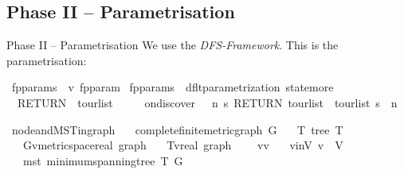 \documentclass[%
	sans,
	12pt,
]{beamer}
\def\isacartoucheopen{}%
\def\isacartoucheclose{}%
\begin{document}
\subsection{Phase II -- Parametrisation} %
\begin{frame}{Phase II -- Parametrisation}
\vspace{8mm}
We use the \textit{DFS-Framework}. This is the parametrisation:
\vspace{-2mm}
\begin{isabelle}
	\isamarkupfalse%
	\ fp{}{\isacharunderscore}params\ {\isacharcolon}{\isacharcolon}\ {\isachardoublequoteopen}{\isacharprime}v\ fp{}{\isacharunderscore}param{\isachardoublequoteclose}\ \isanewline
	{\isachardoublequoteopen}fp{}{\isacharunderscore}params\ {\isasymequiv}\ dflt{\isacharunderscore}parametrization\ state{\isachardot}more\isanewline
	\ \ {\isacharparenleft}RETURN\ {\isasymlparr}\ tour{\isacharunderscore}list\ {\isacharequal}\ {\isacharbrackleft}{\isacharbrackright}\ {\isasymrparr}{\isacharparenright}\isanewline
	\ \ {\isasymlparr}on{\isacharunderscore}discover\ {\isacharcolon}{\isacharequal}\ {\isasymlambda}{\isacharunderscore}\ n\ s{\isachardot}\ RETURN\ {\isasymlparr}tour{\isacharunderscore}list\ {\isacharequal}\ tour{\isacharunderscore}list\ s\ {\isacharat}\ {\isacharbrackleft}n{\isacharbrackright}{\isasymrparr}\ {\isasymrparr}{\isachardoublequoteclose}
\end{isabelle}\pause
\vspace{-5mm}
\begin{isabelle}
	\isamarkupfalse%
	\ node{\isacharunderscore}and{\isacharunderscore}MST{\isacharunderscore}in{\isacharunderscore}graph\ {\isacharequal}\isanewline
	\ \ complete{\isacharunderscore}finite{\isacharunderscore}metric{\isacharunderscore}graph\ G\ {\isacharplus}\isanewline
	\ \ T{\isacharcolon}\ tree\ T\isanewline
	\ \ \ G{\isacharcolon}{\isacharcolon}{\isacartoucheopen}{\isacharparenleft}{\isacharprime}v{\isacharcolon}{\isacharcolon}metric{\isacharunderscore}space{\isacharcomma}real{\isacharparenright}\ graph{\isacartoucheclose}\isanewline
	\ \ \ T{\isacharcolon}{\isacharcolon}{\isacartoucheopen}{\isacharparenleft}{\isacharprime}v{\isacharcomma}real{\isacharparenright}\ graph{\isacartoucheclose}\ {\isacharplus}\isanewline
	\ \ \ v\isactrlsub {\isadigit{0}}{\isacharcolon}{\isacharcolon}{\isacartoucheopen}{\isacharprime}v{\isacartoucheclose}\isanewline
	\ \ \ v{\isacharunderscore}in{\isacharunderscore}V{\isacharcolon}\ {\isacartoucheopen}v\ {\isasymin}\ V{\isacartoucheclose}\isanewline
	\ \ \ mst{\isacharcolon}\ {\isacartoucheopen}minimum{\isacharunderscore}spanning{\isacharunderscore}tree\ T\ G{\isacartoucheclose}
\end{isabelle}
\end{frame}
\end{document}
